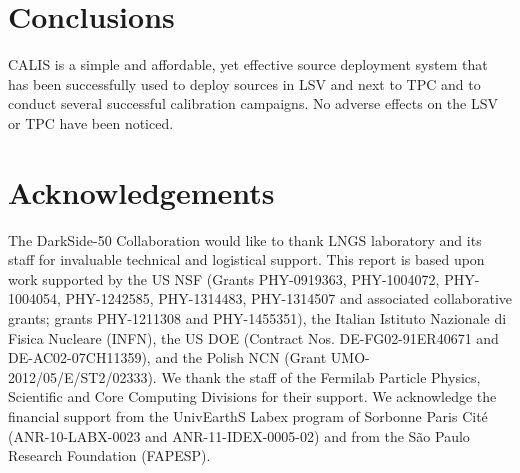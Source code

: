 \section{Conclusions}\label{sec:Conclusions}\label{sec:Conclusion}
CALIS is a simple and affordable, yet effective source deployment system that has been successfully used to deploy sources in LSV and next to TPC and to conduct several successful calibration campaigns. No adverse effects on the LSV or TPC have been noticed.



\section{Acknowledgements}\label{sec:Acknowledgements}
The DarkSide-50 Collaboration would like to thank LNGS laboratory and its staff for invaluable technical and logistical support. This report is based upon work supported by the US NSF (Grants PHY-0919363, PHY-1004072, PHY-1004054, PHY-1242585, PHY-1314483, PHY-1314507 and associated collaborative grants; grants PHY-1211308 and PHY-1455351), the Italian Istituto Nazionale di Fisica Nucleare (INFN), the US DOE (Contract Nos. DE-FG02-91ER40671 and DE-AC02-07CH11359), and the Polish NCN (Grant UMO-2012/05/E/ST2/02333). We thank the staff of the Fermilab Particle Physics, Scientific and Core Computing Divisions for their support. We acknowledge the financial support from the UnivEarthS Labex program of Sorbonne Paris Cité (ANR-10-LABX-0023 and ANR-11-IDEX-0005-02) and from the São Paulo Research Foundation (FAPESP).